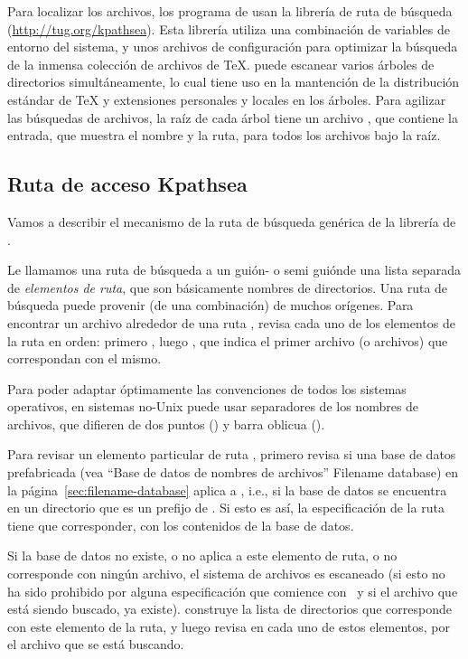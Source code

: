 \documentclass{article}
\begin{document}
Para localizar los archivos, los programa de \Webc{} usan la
librería de ruta de búsqueda \KPS{}
(\url{http://tug.org/kpathsea}). Esta librería utiliza una
combinación de variables de entorno del sistema, y unos
archivos de configuración para optimizar la búsqueda de la inmensa
colección de archivos de \TeX{}. \Webc{} puede escanear varios
árboles de directorios simultáneamente, lo cual tiene uso en
la mantención de la distribución estándar de \TeX{} y
extensiones personales y locales en los árboles. Para agilizar
las búsquedas de archivos, la raíz de cada árbol tiene un
archivo , que contiene la entrada, que muestra el
nombre y la ruta, para todos los archivos bajo la raíz. 

\subsection{Ruta de acceso Kpathsea}
\label{sec:kpathsea}

Vamos a describir el mecanismo de la ruta de búsqueda genérica
de la librería de \KPS{}.

Le llamamos una ruta de búsqueda a un guión- o semi guión\hyph de una
lista separada de \emph{elementos de ruta}, que son
básicamente nombres de directorios. Una ruta de búsqueda puede
provenir (de una combinación) de muchos orígenes. Para
encontrar un archivo  alrededor de una ruta
, \KPS{} revisa cada uno de los elementos de la
ruta en orden: primero , luego
, que indica el primer archivo (o
archivos) que correspondan con el mismo. 

Para poder adaptar óptimamente las convenciones de todos los
sistemas operativos, en sistemas no-Unix \KPS{} puede usar
separadores de los nombres de archivos, que difieren de dos puntos
(\samp{:}) y barra oblicua (\samp{/}). 

Para revisar un elemento particular de ruta , \KPS{}
primero revisa si una base de datos prefabricada (vea
``Base de datos de nombres de archivos'' Filename data\-base) en la
página~\ref{sec:filename-database} aplica a , i.e., si
la base de datos se encuentra en un directorio que es un
prefijo de . Si esto es así, la especificación de la
ruta tiene que corresponder, con los contenidos de la base de
datos. 

Si la base de datos no existe, o no aplica a este elemento de
ruta, o no corresponde con ningún archivo, el sistema de
archivos es escaneado (si esto no ha sido prohibido por alguna
especificación que comience con \samp{!!}\ y si el archivo que
está siendo buscado, ya existe). \KPS{} construye la
lista de directorios que corresponde con este elemento de la
ruta, y luego revisa en cada uno de estos elementos, por el
archivo que se está buscando. 
\end{document}
